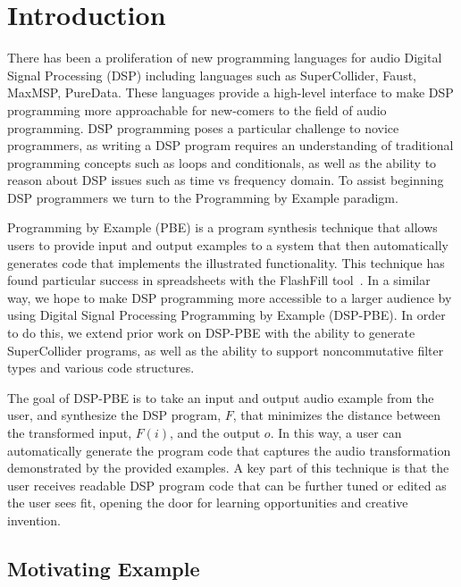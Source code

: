 
\section{Introduction}

There has been a proliferation of new programming languages for audio Digital Signal Processing (DSP) including languages such as SuperCollider, Faust, MaxMSP, PureData.
These languages provide a high-level interface to make DSP programming more approachable for new-comers to the field of audio programming.
DSP programming poses a particular challenge to novice programmers, as writing a DSP program requires an understanding of traditional programming concepts such as loops and conditionals, as well as the ability to reason about DSP issues such as time vs frequency domain.
To assist beginning DSP programmers we turn to the Programming by Example paradigm.

Programming by Example (PBE) is a program synthesis technique that allows users to provide input and output examples to a system that then automatically generates code that implements the illustrated functionality.
This technique has found particular success in spreadsheets with the FlashFill tool~\cite{flashfill}.
In a similar way, we hope to make DSP programming more accessible to a larger audience by using Digital Signal Processing Programming by Example (DSP-PBE).
In order to do this, we extend prior work on DSP-PBE with the ability to generate SuperCollider programs, as well as the ability to support noncommutative filter types and various code structures.

The goal of DSP-PBE is to take an input and output audio example from the user, and synthesize the DSP program, $F$, that minimizes the distance between the transformed input, $F(i)$, and the output $o$.
In this way, a user can automatically generate the program code that captures the audio transformation demonstrated by the provided examples.
A key part of this technique is that the user receives readable DSP program code that can be further tuned or edited as the user sees fit, opening the door for learning opportunities and creative invention.


\subsection{Motivating Example}


